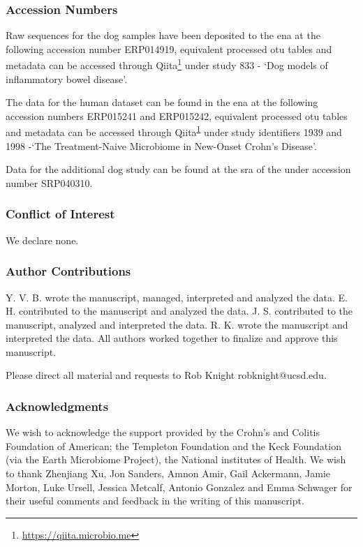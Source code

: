 \subsubsection{Accession Numbers}

Raw sequences for the dog samples have been deposited to the \gls{ena} at the following accession number ERP014919, equivalent processed \gls{otu} tables and metadata can be accessed through Qiita\footnote{\label{qiitaurl}\url{https://qiita.microbio.me}} under study 833 - `Dog models of inflammatory bowel disease'.

The data for the human dataset\cite{RN154} can be found in the \gls{ena} at the following accession numbers ERP015241 and ERP015242, equivalent processed \gls{otu} tables and metadata can be accessed through Qiita\textsuperscript{\ref{qiitaurl}} under study identifiers 1939 and 1998 -`The Treatment-Naive Microbiome in New-Onset Crohn's Disease'.

Data for the additional dog study \cite{RN153} can be found at the \gls{sra} of the under accession number SRP040310.

\subsubsection{Conflict of Interest}
We declare none.

\subsubsection{Author Contributions}
Y. V. B. wrote the manuscript, managed, interpreted and analyzed the data. E. H. contributed to the manuscript and analyzed the data. J. S. contributed to the manuscript, analyzed and interpreted the data. R. K. wrote the manuscript and interpreted the data. All authors worked together to finalize and approve this manuscript.

Please direct all material and requests to Rob Knight robknight@ucsd.edu.

\subsubsection{Acknowledgments}

We wish to acknowledge the support provided by the Crohn's and Colitis Foundation of American; the Templeton Foundation and the Keck Foundation (via the Earth Microbiome Project), the National institutes of Health. We wish to thank Zhenjiang Xu, Jon Sanders, Amnon Amir, Gail Ackermann, Jamie Morton, Luke Ursell, Jessica Metcalf, Antonio Gonzalez and Emma Schwager for their useful comments and feedback in the writing of this manuscript. 
